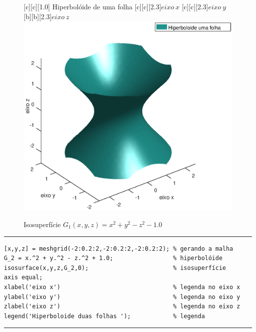 \begin{figure}[htpb]
\begin{center} 
[c][c][1.0]{\hspace{0.25cm} Hiperbolóide de uma folha}
[c][c][2.3]{$eixo \ x$}
[c][c][2.3]{$eixo \ y$}
[b][b][2.3]{$eixo \ z$}
\includegraphics*[angle=0,scale=0.5]{imagens/cap2/hipumafolha.eps} 
\caption{Isosuperfície $G_1(x,y,z)=x^2+y^2-z^2-1.0$} 
\label{fig.hipumafolha}
\end{center}
\end{figure}



\begin{Codigo}[htpb]
\noindent\rule{13cm}{1.pt}
\begin{verbatim}
[x,y,z] = meshgrid(-2:0.2:2,-2:0.2:2,-2:0.2:2); % gerando a malha
G_2 = x.^2 + y.^2 - z.^2 + 1.0;                 % hiperbolóide
isosurface(x,y,z,G_2,0);                        % isosuperfície
axis equal;
xlabel('eixo x')                                % legenda no eixo x
ylabel('eixo y')                                % legenda no eixo y
zlabel('eixo z')                                % legenda no eixo z
legend('Hiperboloide duas folhas ');            % legenda 
\end{verbatim}
\caption{Código utilizado para gerar a figura \ref{fig.hipduasfolhas}} 
\noindent\rule{13cm}{1.pt}
\label{supcurvanivelb}
\end{Codigo}

